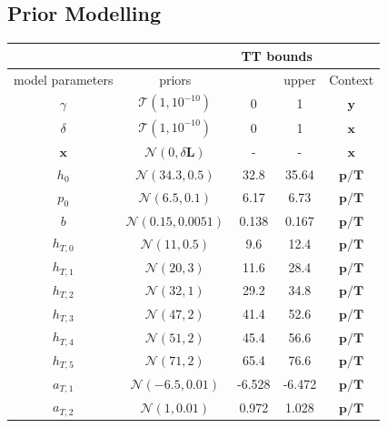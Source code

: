 \subsection{Prior Modelling}
\begin{table}
	\centering
	\begin{tabular}{ |c||c|c|c|c|   }
		\hline
		& &\multicolumn{2}{|c|}{TT bounds}&\\
		\hline
		model parameters& priors&\makecell{lower}& \makecell{upper\\
		}&Context\\
		\hline
		$\gamma$ & $\mathcal{T}(1,10^{-10})$ &0 &1& $\bm{y}$\\ \hhline{|=||=|=|=|=|}
		$\delta$ &$\mathcal{T}(1,10^{-10})$ & 0&1& $\bm{x}$\\ \hline
		$\bm{x}$ &$\mathcal{N}(0,\delta \bm{L})$ & -&-& $\bm{x}$\\ \hhline{|=||=|=|=|=|}
		$h_0$ &  $\mathcal{N}(34.3,0.5)$& 32.8&35.64&$\bm{p/T}$\\ \hline
		$p_0$ &  $\mathcal{N}(6.5,0.1)$&6.17 &6.73&$\bm{p/T}$\\ \hline
		$b$ &  $\mathcal{N}(0.15,0.0051)$& 0.138  &0.167&$\bm{p/T}$\\ \hline
		$h_{T,0}$ &  $\mathcal{N}(11,0.5)$&9.6 &12.4&$\bm{p/T}$\\ \hline
		$h_{T,1}$ &  $\mathcal{N}(20,3)$&11.6 &28.4&$\bm{p/T}$\\ \hline
		$h_{T,2}$ &  $\mathcal{N}(32,1)$&29.2 &34.8&$\bm{p/T}$\\ \hline
		$h_{T,3}$ &  $\mathcal{N}(47,2)$&41.4 &52.6&$\bm{p/T}$\\ \hline
		$h_{T,4}$ &  $\mathcal{N}(51,2)$&45.4 &56.6&$\bm{p/T}$\\ \hline
		$h_{T,5}$ &  $\mathcal{N}(71,2)$&65.4 &76.6&$\bm{p/T}$\\ \hline
		$a_{T,1}$ &  $\mathcal{N}(-6.5,0.01)$&-6.528 &-6.472&$\bm{p/T}$\\ \hline
		$a_{T,2}$ &  $\mathcal{N}(1,0.01)$&0.972 &1.028&$\bm{p/T}$\\ \hline

\end{tabular}
\end{table}
